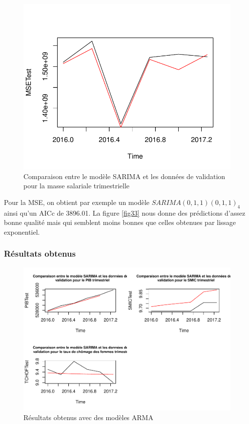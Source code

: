 \documentclass[11pt,]{article}
\begin{document}
\begin{figure}

{\centering \includegraphics{Rapport_final_files/figure-latex/unnamed-chunk-55-1} 

}

\caption{\label{fig33} Comparaison entre le modèle SARIMA et les données de validation pour la masse salariale trimestrielle}\label{fig:unnamed-chunk-55}
\end{figure}

Pour la MSE, on obtient par exemple un modèle \(SARIMA(0,1,1)(0,1,1)_4\)
ainsi qu'un AICc de 3896.01. La figure \ref{fig33} nous donne des
prédictions d'assez bonne qualité mais qui semblent moins bonnes que
celles obtenues par lissage exponentiel.

\subsubsection{Résultats obtenus}\label{resultats-obtenus-1}

\begin{figure}[htbp]
\centering
\includegraphics{Rapport_final_files/figure-latex/unnamed-chunk-57-1.pdf}
\caption{\label{fig34} Résultats obtenus avec des modèles ARMA}
\end{figure}
\end{document}
